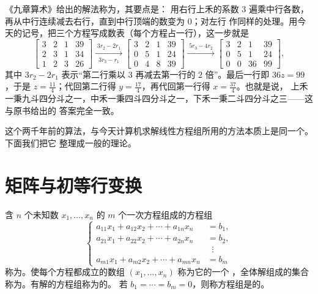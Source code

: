 《九章算术》给出的解法称为，其要点是：
用右行上禾的系数 $3$ 遍乘中行各数，再从中行连续减去右行，直到中行顶端的数变为 $0$；对左行
作同样的处理。用今天的记号，把三个方程写成数表（每个方程占一行），这一步就是
\[
\left[\begin{array}{ccc|c}
3 & 2 & 1 & 39\\
2 & 3 & 1 & 34\\
1 & 2 & 3 & 26
\end{array}\right]
\xrightarrow[\;3r_3-r_1\;]{\;3r_2-2r_1\;}
\left[\begin{array}{ccc|c}
3 & 2 & 1 & 39\\
0 & 5 & 1 & 24\\
0 & 4 & 8 & 39
\end{array}\right]
\xrightarrow{\;5r_3-4r_2\;}
\left[\begin{array}{ccc|c}
3 & 2 & 1 & 39\\
0 & 5 & 1 & 24\\
0 & 0 & 36 & 99
\end{array}\right],
\]
其中 $3r_2-2r_1$ 表示“第二行乘以 $3$ 再减去第一行的 $2$ 倍”。最后一行即 $36z=99$，于是
$z=\frac{11}{4}$；代回第二行得 $y=\frac{17}{4}$，再代回第一行得 $x=\frac{37}{4}$。也就是说，
上禾一秉九斗四分斗之一，中禾一秉四斗四分斗之一，下禾一秉二斗四分斗之三——这与原书给出的
答案完全一致。

这个两千年前的算法，与今天计算机求解线性方程组所用的方法本质上是同一个。下面我们把它
整理成一般的理论。

\section{矩阵与初等行变换}\label{sec:matrix}

\begin{definition}\label{def:system}
含 $n$ 个未知数 $x_1,\dotsc,x_n$ 的 $m$ 个一次方程组成的方程组
\begin{equation}\label{eq:general-system}
\left\{
\begin{aligned}
  a_{11}x_1+a_{12}x_2+\dotsb+a_{1n}x_n&=b_1,\\
  a_{21}x_1+a_{22}x_2+\dotsb+a_{2n}x_n&=b_2,\\
  &\;\;\vdots\\
  a_{m1}x_1+a_{m2}x_2+\dotsb+a_{mn}x_n&=b_m
\end{aligned}
\right.
\end{equation}
称为。使每个方程都成立的数组 $(x_1,\dotsc,x_n)$ 称为它的一个
，全体解组成的集合称为。有解的方程组称为的。
若 $b_1=\dotsb=b_m=0$，则称方程组是的。
\end{definition}

